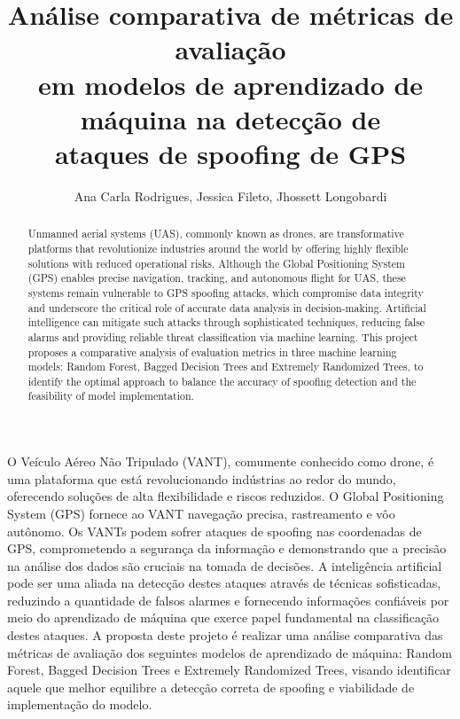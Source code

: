 \documentclass[12pt]{article}
\title{Análise comparativa de métricas de avaliação\\
em modelos de aprendizado de máquina na detecção de\\
ataques de spoofing de GPS
}
\author{Ana Carla Rodrigues\inst{1}, Jessica Fileto\inst{1}, 
    Jhossett Longobardi\inst{1}}
\begin{document}
 

\maketitle

\begin{abstract}
Unmanned aerial systems (UAS), commonly known as drones, are transformative 
platforms that revolutionize industries around the world by offering highly 
flexible solutions with reduced operational risks. Although the Global 
Positioning System (GPS) enables precise navigation, tracking, and autonomous 
flight for UAS, these systems remain vulnerable to GPS spoofing attacks, which 
compromise data integrity and underscore the critical role of accurate data 
analysis in decision-making. Artificial intelligence can mitigate such attacks 
through sophisticated techniques, reducing false alarms and providing reliable 
threat classification via machine learning. This project proposes a comparative 
analysis of evaluation metrics in three machine learning models: Random Forest, 
Bagged Decision Trees and Extremely Randomized Trees, to identify the optimal 
approach to balance the accuracy of spoofing detection and the feasibility of 
model implementation.
\end{abstract}
     
\begin{resumo} 
O Veículo Aéreo Não Tripulado (VANT), comumente conhecido como drone, é uma
plataforma que está revolucionando indústrias ao redor do mundo, oferecendo 
soluções de alta flexibilidade e riscos reduzidos. O Global Positioning System 
(GPS) fornece ao VANT navegação precisa, rastreamento e vôo autônomo. Os VANTs 
podem sofrer ataques de spoofing nas coordenadas de GPS, comprometendo a 
segurança da informação e demonstrando que a precisão na análise dos dados são 
cruciais na tomada de decisões. A inteligência artificial pode ser uma aliada 
na detecção destes ataques através de técnicas sofisticadas, reduzindo a 
quantidade de falsos alarmes e fornecendo informações confiáveis por meio do 
aprendizado de máquina que exerce papel fundamental na classificação destes 
ataques. A proposta deste projeto é realizar uma análise comparativa das 
métricas de avaliação dos seguintes modelos de aprendizado de máquina: Random 
Forest, Bagged Decision Trees e Extremely Randomized Trees, visando identificar 
aquele que melhor equilibre a detecção correta de spoofing e viabilidade de 
implementação do modelo.
\end{resumo}
\end{document}
